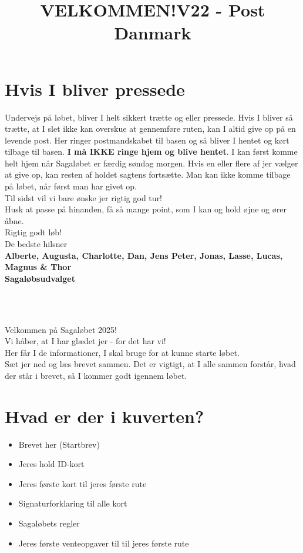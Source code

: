 \section{Hvis I bliver pressede}
Undervejs på løbet, bliver I helt sikkert trætte og eller pressede. Hvis I bliver så trætte, at I slet ikke kan overskue at gennemføre ruten, kan I altid give op på en levende post. Her ringer postmandskabet til basen og så bliver I hentet og kørt tilbage til basen. \textbf{I må IKKE ringe hjem og blive hentet}. I kan først komme helt hjem når Sagaløbet er færdig søndag morgen. Hvis en eller flere af jer vælger at give op, kan resten af holdet sagtens fortsætte. Man kan ikke komme tilbage på løbet, når først man har givet op.\\
\newline
Til sidst vil vi bare ønske jer rigtig god tur!\\
Husk at passe på hinanden, få så mange point, som I kan og hold øjne og ører åbne.\\
\newline
Rigtig godt løb!\\
\newline
\textcolor{søblå}{De bedste hilsner}\\
\textcolor{natblå}{\textbf{Alberte, Augusta, Charlotte, Dan, Jens Peter, Jonas, Lasse, Lucas, Magnus \& Thor}}\\
\textcolor{natblå}{\textbf{Sagaløbsudvalget}}\\
\newpage
\title{VELKOMMEN!}\\
\newline
\title{\textcolor{søblå}{V22 - Post Danmark }}\\
\newline
Velkommen på Sagaløbet 2025!\\
Vi håber, at I har glædet jer - for det har vi!\\
Her får I de informationer, I skal bruge for at kunne starte løbet.\\
Sæt jer ned og læs brevet sammen. Det er vigtigt, at I alle sammen forstår, hvad der står i brevet, så I kommer godt igennem løbet.
\section{Hvad er der i kuverten?}
\begin{itemize}
    \item Brevet her (Startbrev)
    \item Jeres hold ID-kort
    \item Jeres første kort til jeres første rute
    \item Signaturforklaring til alle kort
    \item Sagaløbets regler
    \item Jeres første venteopgaver til til jeres første rute
\end{itemize}
